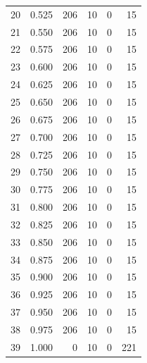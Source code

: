 \documentclass[a4paper,twoside,12pt]{book}
\begin{document}
\begin{appendices}
\begin{table}
\begin{tabular}{lrrrrr}
		20 &  0.525 &       206 &        10 &               0 &              15 \\
		21 &  0.550 &       206 &        10 &               0 &              15 \\
		22 &  0.575 &       206 &        10 &               0 &              15 \\
		23 &  0.600 &       206 &        10 &               0 &              15 \\
		24 &  0.625 &       206 &        10 &               0 &              15 \\
		25 &  0.650 &       206 &        10 &               0 &              15 \\
		26 &  0.675 &       206 &        10 &               0 &              15 \\
		27 &  0.700 &       206 &        10 &               0 &              15 \\
		28 &  0.725 &       206 &        10 &               0 &              15 \\
		29 &  0.750 &       206 &        10 &               0 &              15 \\
		30 &  0.775 &       206 &        10 &               0 &              15 \\
		31 &  0.800 &       206 &        10 &               0 &              15 \\
		32 &  0.825 &       206 &        10 &               0 &              15 \\
		33 &  0.850 &       206 &        10 &               0 &              15 \\
		34 &  0.875 &       206 &        10 &               0 &              15 \\
		35 &  0.900 &       206 &        10 &               0 &              15 \\
		36 &  0.925 &       206 &        10 &               0 &              15 \\
		37 &  0.950 &       206 &        10 &               0 &              15 \\
		38 &  0.975 &       206 &        10 &               0 &              15 \\
		39 &  1.000 &         0 &        10 &               0 &             221 \\
		\bottomrule
	\end{tabular}
\end{table}
	

\end{appendices}
\end{document}
